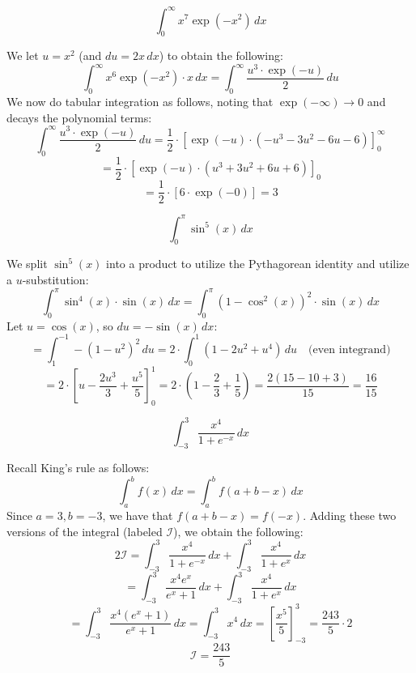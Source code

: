\begin{questions}

    \question \[ \int_{0}^{\infty} x^7 \exp(-x^2) \,dx \]
    \begin{solution}
        We let $u = x^2$ (and $du = 2x \,dx$) to obtain the following:
        \[ \int_{0}^{\infty} x^6 \exp(-x^2) \cdot x \,dx = \int_{0}^{\infty} \frac{u^3 \cdot \exp(-u)}{2} \,du \]
        We now do tabular integration as follows, noting that $\exp(-\infty) \to 0$ and decays the polynomial terms:
        \[ \int_{0}^{\infty} \frac{u^3 \cdot \exp(-u)}{2} \,du = \frac{1}{2} \cdot \left[ \exp(-u) \cdot (-u^3 - 3u^2 - 6u - 6) \right]_{0}^{\infty} \]
        \[ = \frac{1}{2} \cdot \left[ \exp(-u) \cdot (u^3 + 3u^2 + 6u + 6) \right]_{0} \]
        \[ = \frac{1}{2} \cdot [6 \cdot \exp(-0)] = 3 \]
    \end{solution}

    \question \[ \int_{0}^{\pi} \sin^5(x) \,dx \]
    \begin{solution}
        We split $\sin^5(x)$ into a product to utilize the Pythagorean identity and utilize a $u$-substitution:
        \[ \int_{0}^{\pi} \sin^4(x) \cdot \sin(x) \,dx = \int_{0}^{\pi} (1 - \cos^2(x))^2 \cdot \sin(x) \,dx \]
        Let $u = \cos(x)$, so $du = -\sin(x) \,dx$:
        \[ = \int_{1}^{-1} -(1 - u^2)^2 \,du = 2 \cdot \int_{0}^{1} (1 - 2u^2 + u^4) \,du \quad \text{(even integrand)} \]
        \[ = 2 \cdot \left[ u - \frac{2u^3}{3} + \frac{u^5}{5} \right]_{0}^{1} = 2 \cdot \left( 1 - \frac{2}{3} + \frac{1}{5} \right) = \frac{2(15 - 10 + 3)}{15} = \frac{16}{15} \]
    \end{solution}

    \question \[ \int_{-3}^{3} \frac{x^4}{1 + e^{-x}} \,dx \]
    \begin{solution}
        Recall King's rule as follows:
        \[ \int_{a}^{b} f(x) \,dx = \int_{a}^{b} f(a + b - x) \,dx \]
        Since $a = 3, b = -3$, we have that $f(a + b - x) = f(-x)$. Adding these two versions of the integral (labeled $\mathcal{I}$), we obtain the following:
        \[ 2\mathcal{I} = \int_{-3}^{3} \frac{x^4}{1 + e^{-x}} \,dx + \int_{-3}^{3} \frac{x^4}{1 + e^x} \,dx \]
        \[ = \int_{-3}^{3} \frac{x^4 e^x}{e^x + 1} \,dx + \int_{-3}^{3} \frac{x^4}{1 + e^x} \,dx \]
        \[ = \int_{-3}^{3} \frac{x^4 (e^x + 1)}{e^x + 1} \,dx = \int_{-3}^{3} x^4 \,dx = \left[ \frac{x^5}{5} \right]_{-3}^{3} = \frac{243}{5} \cdot 2 \]
        \[ \mathcal{I} = \frac{243}{5} \]
    \end{solution}


\end{questions}
